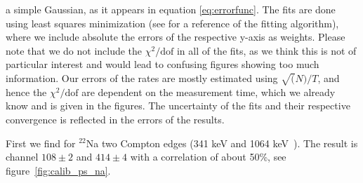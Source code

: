 a simple Gaussian, as it appears in equation \eqref{eq:errorfunc}.
The fits are done using least squares minimization (see 
\cite{scipy} for a reference of the fitting algorithm), where 
we include absolute the errors of the respective y-axis as 
weights. Please note
that we do not include the $\chi^2/\mathrm{dof}$ in all of the fits,
as we think this is not of particular interest and would lead
to confusing figures showing too much information. Our errors
of the rates are mostly estimated using $\sqrt(N)/T$, and hence
the $\chi^2/\mathrm{dof}$ are dependent 
on the measurement time, which we already know and
is given in the figures. The uncertainty of the fits and their
respective convergence is reflected in the errors of the 
results. 

First we find for $^{22}$Na two Compton edges (341 keV and
1064 keV~\cite{nist}). The result is
channel $108 \pm 2$ and $414 \pm 4$ with a correlation of about 50\%, see
figure~\ref{fig:calib_ps_na}.

